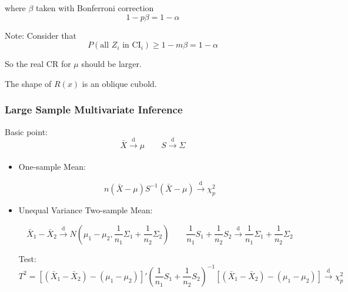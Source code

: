 \begin{itemize}
    where $ \beta  $ taken with Bonferroni correction
    \begin{equation}
        1-p\beta =1-\alpha  
    \end{equation}
    
    Note: Consider that
    \begin{equation}
        P(\text{all }Z_i\text{ in CI}_i)\geq 1-m\beta =1-\alpha  
    \end{equation}

    So the real CR for $ \mu $ should be larger.
    

    The shape of $ R(x) $ is an oblique cubold.
    
\end{itemize}
        





\subsubsection{Large Sample Multivariate Inference}
    Basic point:
    \begin{equation}
        \bar{X}\xrightarrow[]{\mathrm{d}} \mu\qquad S\xrightarrow[]{\mathrm{d}} \Sigma  
    \end{equation}
\begin{itemize}[topsep=2pt,itemsep=2pt]
    \item One-sample Mean:
    
    \begin{equation}
        n(\bar{X}-\mu)S^{-1}(\bar{X}-\mu)\xrightarrow[]{\mathrm{d}} \chi^2_p 
    \end{equation}

    \item Unequal Variance Two-sample Mean:
    
    \begin{equation}
        \bar{X}_1-\bar{X}_2\xrightarrow[]{\mathrm{d}} N\left(\mu_1-\mu _2,\dfrac{1}{n_1}\Sigma _1+\dfrac{1}{n_2}\Sigma _2\right) \qquad \dfrac{1}{n_1}S_1+\dfrac{1}{n_2}S_2\xrightarrow[]{\mathrm{d}} \dfrac{1}{n_1}\Sigma _1+\dfrac{1}{n_2}\Sigma _2
    \end{equation}

    Test:
    \begin{equation}
        T^2=\left[(\bar{X}_1-\bar{X}_2)-(\mu _1-\mu _2) \right]'(\dfrac{1}{n_1}S_1+\dfrac{1}{n_2}S_2)^{-1}\left[(\bar{X}_1-\bar{X}_2)-(\mu _1-\mu _2) \right]\xrightarrow[]{\mathrm{d}} \chi^2_p
    \end{equation}
    
    
    
    
\end{itemize}

